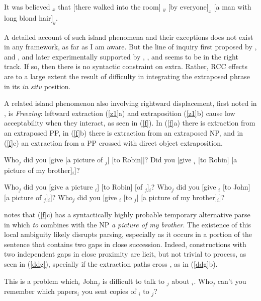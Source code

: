 \documentclass[output=paper]{langsci/langscibook}
\begin{document}
\ex \label{roch} \bad{*}It was believed \spc$_x$ that $[$there walked into the room$]$ \spc$_y$ $[$by everyone$]_x$ $[$a man with  long blond hair$]_y$.\\
\citep{rochemont}
\z
\z

A detailed account of such island phenomena and their exceptions does not exist in any framework, as far as I
am aware. But the line of inquiry first proposed by  \citet{grosurrc},  \citet{gazdar} and \citet{stucky},  and later experimentally supported by \citet{levyted}, \citet{strunk08}, and \citet{strunk} seems to be in the right track. If so, then there is no syntactic constraint on {\sc extra}. Rather, RCC effects are to a large extent the result of difficulty in integrating the extraposed phrase in its  \emph{in situ} position.  

A related island phenomenon also involving rightward displacement, first noted in \citet[305]{Ross67},
is \emph{Freezing}: leftward extraction (\ref{z1}a) and extraposition (\ref{z1}b) cause low acceptability when they interact, as seen in (\ref{f}). In (\ref{f}a) there is extraction from an extraposed PP,  in (\ref{f}b)  there is extraction from an extraposed NP,  and  in (\ref{f}c) an extraction from a PP crossed with direct object extraposition. 
 
 
\ea 
\ea Who$_j$ did you [give [a picture of \spc$_j$] [to Robin]]?
\ex Did you [give \spc$_i$ [to Robin] [a picture of my brother]$_i$]?
\z \label{z1}
\z

\ea
\ea \bad{*}Who$_j$ did you [give a picture  \spc$_i$]  [to Robin] [of \spc$_j$]$_i$?    
\ex \bad{*}Who$_j$ did you [give \spc$_i$ [to John] [a picture of \spc$_j$]$_i$]? 
\ex \bad{*}Who$_j$ did you [give \spc$_i$ [to \spc$_j$] [a picture of my brother]$_i$]?
\z \label{f}
\z


  \citet[457]{fodor78} notes that (\ref{f}c) has a syntactically highly probable temporary alternative parse  in which \emph{to} combines with the NP \emph{a picture of my brother}. The existence of this local ambiguity  likely disrupts  parsing, especially as it occurs in a portion of the sentence that contains two gaps in close succession. Indeed, constructions with two independent gaps in close proximity  are licit, but not trivial to process, as seen in (\ref{ddg}), specially if the  extraction paths cross  \citep{fodor78}, as in (\ref{ddg}b).

\ea
\ea This is a problem which$_i$ John$_j$ is difficult 
to talk to  \spc$_j$ about \spc$_i$.
\ex Who$_j$  can't  you remember which papers$_i$ 
you sent copies of \spc$_i$ to \spc$_j$?
\z \label{ddg}
\z
\end{document}
